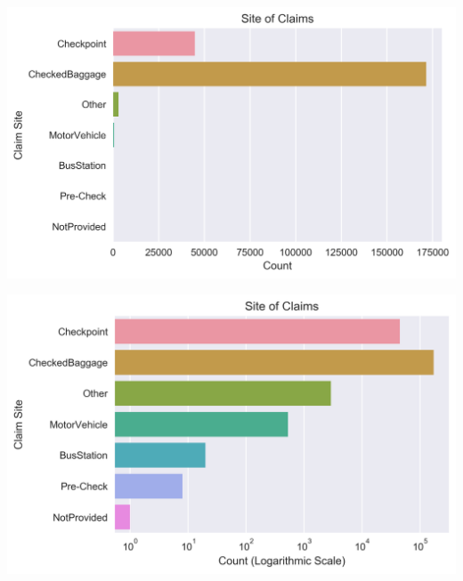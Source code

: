 \documentclass{beamer}
\begin{document}
\begin{frame}
	\includegraphics[keepaspectratio, width = \textwidth, height = \textheight]{../plots/sites}
\end{frame}

\begin{frame}
	\includegraphics[keepaspectratio, width = \textwidth, height = \textheight]{../plots/log_sites}
\end{frame}
\end{document}
